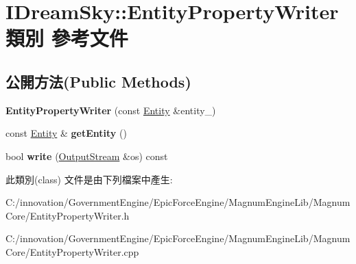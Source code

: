 \hypertarget{class_i_dream_sky_1_1_entity_property_writer}{}\section{I\+Dream\+Sky\+:\+:Entity\+Property\+Writer 類別 參考文件}
\label{class_i_dream_sky_1_1_entity_property_writer}
\subsection*{公開方法(Public Methods)}
\begin{DoxyCompactItemize}
\item 
{\bfseries Entity\+Property\+Writer} (const \hyperlink{class_i_dream_sky_1_1_entity}{Entity} \&entity\+\_\+)\hypertarget{class_i_dream_sky_1_1_entity_property_writer_a1a1c74d08dc7f507c42cacd470656ea5}{}\label{class_i_dream_sky_1_1_entity_property_writer_a1a1c74d08dc7f507c42cacd470656ea5}

\item 
const \hyperlink{class_i_dream_sky_1_1_entity}{Entity} \& {\bfseries get\+Entity} ()\hypertarget{class_i_dream_sky_1_1_entity_property_writer_a8fd514f42524c9c9b9d4dc5d4b01f49f}{}\label{class_i_dream_sky_1_1_entity_property_writer_a8fd514f42524c9c9b9d4dc5d4b01f49f}

\item 
bool {\bfseries write} (\hyperlink{class_i_dream_sky_1_1_output_stream}{Output\+Stream} \&os) const \hypertarget{class_i_dream_sky_1_1_entity_property_writer_abad55018a0194d7fa50e101feafee62f}{}\label{class_i_dream_sky_1_1_entity_property_writer_abad55018a0194d7fa50e101feafee62f}

\end{DoxyCompactItemize}


此類別(class) 文件是由下列檔案中產生\+:\begin{DoxyCompactItemize}
\item 
C\+:/innovation/\+Government\+Engine/\+Epic\+Force\+Engine/\+Magnum\+Engine\+Lib/\+Magnum\+Core/Entity\+Property\+Writer.\+h\item 
C\+:/innovation/\+Government\+Engine/\+Epic\+Force\+Engine/\+Magnum\+Engine\+Lib/\+Magnum\+Core/Entity\+Property\+Writer.\+cpp\end{DoxyCompactItemize}
